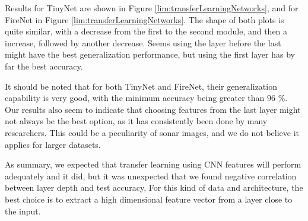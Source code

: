 \begin{figure*}
{
	}
	
	\vspace*{0.5cm}
	\caption[Transfer Learning on Sonar Images]{Transfer Learning on Sonar Images. Mean test accuracy produced by an SVM trained on features output by different layers. Three networks are shown.}
	\label{lim:transferLearningNetworks}
\end{figure*}

Results for TinyNet are shown in Figure \ref{lim:transferLearningNetworks}, and for FireNet in Figure  \ref{lim:transferLearningNetworks}. The shape of both plots is quite similar, with a decrease from the first to the second module, and then a increase, followed by another decrease. Seems using the layer before the last might have the best generalization performance, but using the first layer has by far the best accuracy.

It should be noted that for both TinyNet and FireNet, their generalization capability is very good, with the minimum accuracy being greater than $96$ \%. Our results also seem to indicate that choosing features from the last layer might not always be the best option, as it has consistently been done by many researchers. This could be a peculiarity of sonar images, and we do not believe it applies for larger datasets.

As summary, we expected that transfer learning using CNN features will perform adequately and it did, but it was unexpected that we found negative correlation between layer depth and test accuracy, For this kind of data and architecture, the best choice is to extract a high dimensional feature vector from a layer close to the input.

